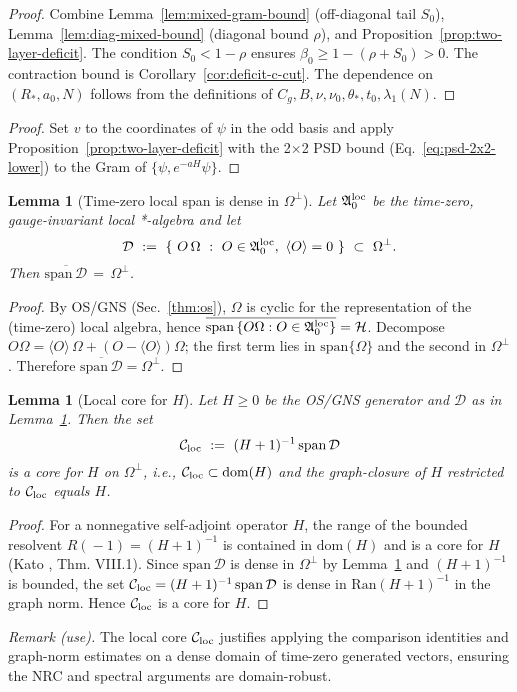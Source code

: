 \documentclass[11pt]{amsart}
\theoremstyle{plain}
\newtheorem{lemma}[theorem]{Lemma}
\theoremstyle{definition}
\theoremstyle{remark}
\begin{document}
\begin{proof}
Combine Lemma~\ref{lem:mixed-gram-bound} (off-diagonal tail $S_0$), Lemma~\ref{lem:diag-mixed-bound} (diagonal bound $\rho$), and Proposition~\ref{prop:two-layer-deficit}. The condition $S_0<1-\rho$ ensures $\beta_0\ge 1-(\rho+S_0)>0$. The contraction bound is Corollary~\ref{cor:deficit-c-cut}. The dependence on $(R_*,a_0,N)$ follows from the definitions of $C_g,B,\nu,\nu_0,\theta_*,t_0,\lambda_1(N)$.
\end{proof}
\begin{proof}
Set $v$ to the coordinates of $\psi$ in the odd basis and apply Proposition~\ref{prop:two-layer-deficit} with the 2$\times$2 PSD bound (Eq.~\eqref{eq:psd-2x2-lower}) to the Gram of $\{\psi,e^{-aH}\psi\}$.
\end{proof}

\medskip
\begin{lemma}[Time-zero local span is dense in $\Omega^{\perp}$]\label{lem:local-span-dense}
Let $\mathfrak{A}_0^{\rm loc}$ be the time-zero, gauge-invariant local *-algebra and let
\[
  \mathcal D\ :=\ \{\ O\,\Omega\ :\ O\in \mathfrak{A}_0^{\rm loc},\ \langle O\rangle=0\ \}\ \subset\ \Omega^{\perp}.
\]
Then $\overline{\mathrm{span}\,\mathcal D}\,=\,\Omega^{\perp}$.
\end{lemma}

\begin{proof}
By OS/GNS (Sec.~\ref{thm:os}), $\Omega$ is cyclic for the representation of the (time-zero) local algebra, hence $\overline{\mathrm{span}\,\{O\Omega: O\in \mathfrak{A}_0^{\rm loc}\}}=\mathcal H$. Decompose $O\Omega=\langle O\rangle\,\Omega+(O-\langle O\rangle)\Omega$; the first term lies in $\mathrm{span}\{\Omega\}$ and the second in $\Omega^{\perp}$. Therefore $\overline{\mathrm{span}\,\mathcal D}=\Omega^{\perp}$.
\end{proof}

\begin{lemma}[Local core for $H$]\label{lem:local-core}
Let $H\ge 0$ be the OS/GNS generator and $\mathcal D$ as in Lemma~\ref{lem:local-span-dense}. Then the set
\[
  \mathcal C_{\rm loc}\ :=\ (H+1)^{-1}\,\mathrm{span}\,\mathcal D
\]
is a core for $H$ on $\Omega^{\perp}$, i.e., $\mathcal C_{\rm loc}\subset\mathrm{dom}(H)$ and the graph-closure of $H$ restricted to $\mathcal C_{\rm loc}$ equals $H$.
\end{lemma}

\begin{proof}
For a nonnegative self-adjoint operator $H$, the range of the bounded resolvent $R(\!-1\!)=(H+1)^{-1}$ is contained in $\mathrm{dom}(H)$ and is a core for $H$ (Kato \cite{Kato1995}, Thm. VIII.1). Since $\mathrm{span}\,\mathcal D$ is dense in $\Omega^{\perp}$ by Lemma~\ref{lem:local-span-dense} and $(H+1)^{-1}$ is bounded, the set $\mathcal C_{\rm loc}=(H+1)^{-1}\,\mathrm{span}\,\mathcal D$ is dense in $\mathrm{Ran}(H+1)^{-1}$ in the graph norm. Hence $\mathcal C_{\rm loc}$ is a core for $H$.
\end{proof}
\noindent\emph{Remark (use).} The local core $\mathcal C_{\rm loc}$ justifies applying the comparison identities and graph-norm estimates on a dense domain of time-zero generated vectors, ensuring the NRC and spectral arguments are domain-robust.
\end{document}
